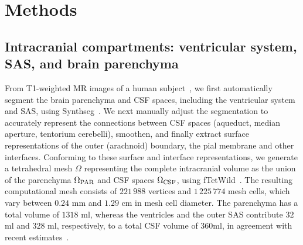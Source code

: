 \documentclass[fleqn,10pt]{wlscirep}
\newcommand{\mer}[1]{\textcolor{magenta}{#1}}
\begin{document}
\newpage
\section*{Methods}


\subsection*{Intracranial compartments: ventricular system, SAS, and brain parenchyma}

From T1-weighted MR images of a human subject~\cite{hodneland2019new},
we first automatically segment the brain parenchyma and CSF spaces,
including the ventricular system and SAS, using
Synthseg~\cite{billot2023robust,billot2023synthseg}. We next manually
adjust the segmentation to accurately represent the connections
between CSF spaces (aqueduct, median aperture, tentorium cerebelli), smoothen, and finally
extract surface representations of the outer (arachnoid) boundary, the
pial membrane and other interfaces. Conforming to these surface and
interface representations, we generate a tetrahedral mesh $\Omega$
representing the complete intracranial volume as the union of the
parenchyma $\Omega_{\rm PAR}$ and CSF spaces $\Omega_{\rm CSF}$, using
fTetWild~\cite{hu2020fast}. The resulting computational mesh consists
of $221\,988$ vertices and $1\,225\,774$ mesh cells, which vary between
$0.24$ mm and $1.29$ cm in mesh cell diameter. The parenchyma has a
total volume of $1318$ ml, whereas the ventricles and the outer SAS
contribute $32$ ml and $328$ ml, respectively, to a total CSF volume
of $360$ml, in agreement with recent estimates~\cite{hladky2024regulation}.


\end{document}
